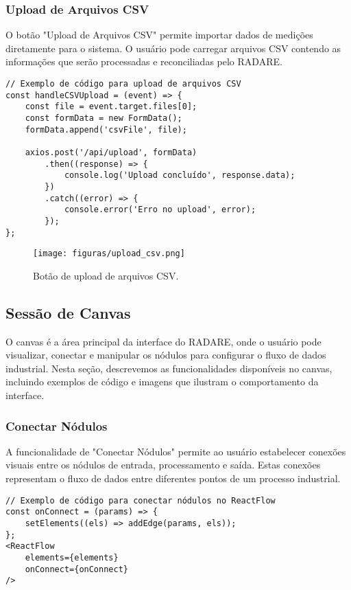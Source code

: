 \subsubsection{Upload de Arquivos CSV}

O botão "Upload de Arquivos CSV" permite importar dados de medições diretamente para o sistema. O usuário pode carregar arquivos CSV contendo as informações que serão processadas e reconciliadas pelo RADARE.

\begin{verbatim}
// Exemplo de código para upload de arquivos CSV
const handleCSVUpload = (event) => {
    const file = event.target.files[0];
    const formData = new FormData();
    formData.append('csvFile', file);

    axios.post('/api/upload', formData)
        .then((response) => {
            console.log('Upload concluído', response.data);
        })
        .catch((error) => {
            console.error('Erro no upload', error);
        });
};
\end{verbatim}

\begin{figure}[htbp]
    \centering
    \texttt{[image: figuras/upload\_csv.png]}
    \caption{Botão de upload de arquivos CSV.}
    \label{Fig:UploadCSV}
\end{figure}


\subsection{Sessão de Canvas}

O canvas é a área principal da interface do RADARE, onde o usuário pode visualizar, conectar e manipular os nódulos para configurar o fluxo de dados industrial. Nesta seção, descrevemos as funcionalidades disponíveis no canvas, incluindo exemplos de código e imagens que ilustram o comportamento da interface.

\subsubsection{Conectar Nódulos}

A funcionalidade de "Conectar Nódulos" permite ao usuário estabelecer conexões visuais entre os nódulos de entrada, processamento e saída. Estas conexões representam o fluxo de dados entre diferentes pontos de um processo industrial.

\begin{verbatim}
// Exemplo de código para conectar nódulos no ReactFlow
const onConnect = (params) => {
    setElements((els) => addEdge(params, els));
};
<ReactFlow
    elements={elements}
    onConnect={onConnect}
/>
\end{verbatim}

